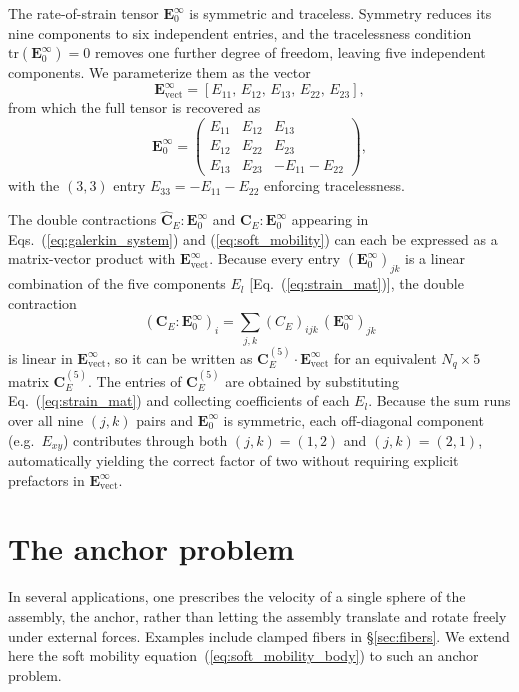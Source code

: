 \documentclass[aps,prfluids,groupedaddress]{revtex4-2}
\newcommand{\bE}{\bm{E}}
\newcommand{\tC}{\bm{{C}}}
\newcommand{\tE}{\bm{{E}}}
\begin{document}
The rate-of-strain tensor $\tE_0^\infty$ is symmetric and traceless. Symmetry reduces its nine components to six independent entries, and the tracelessness condition $\mathrm{tr}(\tE_0^\infty) = 0$ removes one further degree of freedom, leaving five independent components. We parameterize them as the vector
\begin{equation}\label{eq:strain_vec}
\bE^\infty_\mathrm{vect} = [E_{11},\, E_{12},\, E_{13},\, E_{22},\, E_{23}],
\end{equation}
from which the full tensor is recovered as
\begin{equation}\label{eq:strain_mat}
\tE_0^\infty =
\begin{pmatrix}
E_{11} & E_{12} & E_{13} \\
E_{12} & E_{22} & E_{23} \\
E_{13} & E_{23} & -E_{11}-E_{22}
\end{pmatrix},
\end{equation}
with the $(3,3)$ entry $E_{33} = -E_{11}-E_{22}$ enforcing tracelessness.

The double contractions $\hat{\tC}_E:\tE_0^\infty$ and $\tC_E:\tE_0^\infty$ appearing in Eqs.~(\ref{eq:galerkin_system}) and (\ref{eq:soft_mobility}) can each be expressed as a matrix-vector product with $\bE^\infty_\mathrm{vect}$. Because every entry $(\tE_0^\infty)_{jk}$ is a linear combination of the five components $E_l$ [Eq.~(\ref{eq:strain_mat})], the double contraction
\begin{equation}
\left(\tC_E:\tE_0^\infty\right)_i = \sum_{j,k}(C_E)_{ijk}\,(\tE_0^\infty)_{jk}
\end{equation}
is linear in $\bE^\infty_\mathrm{vect}$, so it can be written as $\tC_E^{(5)}\cdot\bE^\infty_\mathrm{vect}$ for an equivalent $N_q\times 5$ matrix $\tC_E^{(5)}$. The entries of $\tC_E^{(5)}$ are obtained by substituting Eq.~(\ref{eq:strain_mat}) and collecting coefficients of each $E_l$. Because the sum runs over all nine $(j,k)$ pairs and $\tE_0^\infty$ is symmetric, each off-diagonal component (e.g.\ $E_{xy}$) contributes through both $(j,k)=(1,2)$ and $(j,k)=(2,1)$, automatically yielding the correct factor of two without requiring explicit prefactors in $\bE^\infty_\mathrm{vect}$.

\section{The anchor problem\label{app:clamped_anchor}}

In several applications, one prescribes the velocity of a single sphere of the assembly, the anchor, rather than letting the assembly translate and rotate freely under external forces. Examples include clamped fibers in \S\ref{sec:fibers}. We extend here the soft mobility equation~(\ref{eq:soft_mobility_body}) to such an anchor problem.
\end{document}

